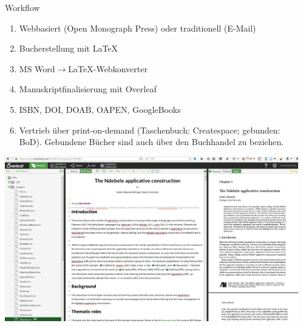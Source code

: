 \documentclass[final,utf8]{beamer}
\begin{document}
\begin{frame}{}
\begin{columns}[t]
\begin{column}{.45\linewidth}
 

 

  \end{column}


  \begin{column}{.45\linewidth}
    





    \begin{block}{Workflow} 
	\begin{enumerate} 
	    \item Webbasiert (Open Monograph Press) oder traditionell (E-Mail)
	    \item Bucherstellung mit {\LaTeX}
	    \item MS Word$\to${\LaTeX}-Webkonverter
	    \item Manuskriptfinalisierung mit Overleaf
	    \item ISBN, DOI, DOAB, OAPEN, GoogleBooks
	    \item Vertrieb \"uber print-on-demand (Taschenbuch: Createspace; gebunden: BoD). Gebundene B\"ucher sind auch \"uber den Buchhandel zu beziehen.
	\end{enumerate}  
     \includegraphics[width=.9\textwidth]{overleaf.png}
  
    \end{block} 




\end{column}
\end{columns}
\end{frame}
\end{document}
